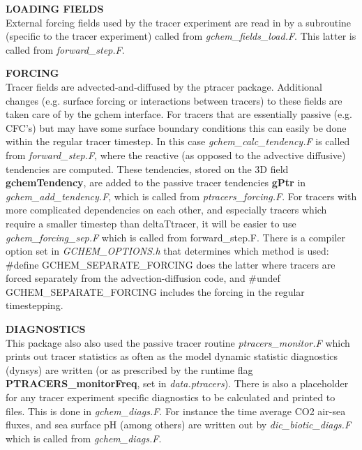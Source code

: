 \noindent
{{\bf LOADING FIELDS}}\\
External forcing fields used by the tracer experiment are read
in by a subroutine (specific to the tracer experiment) called from
{\it gchem\_fields\_load.F}. This latter is called from \textit{forward\_step.F}.

\vspace{.5cm}


\noindent
{{\bf FORCING}}\\
Tracer fields are advected-and-diffused by the ptracer package.
Additional changes (e.g. surface forcing or interactions
between tracers) to these fields are taken care of by the gchem
interface. For tracers that are essentially passive (e.g. CFC's)
but may have some surface boundary conditions
this can easily be done within the regular tracer timestep. In this case
{\it gchem\_calc\_tendency.F} is called from {\it forward\_step.F}, where the 
reactive (as opposed to the advective diffusive) tendencies are computed.
These tendencies, stored on the 3D field \textbf{gchemTendency}, are added to
the passive tracer tendencies \textbf{gPtr} in {\it gchem\_add\_tendency.F}, 
which is called from {\it ptracers\_forcing.F}.
For tracers with more complicated dependencies on each other,
and especially tracers which require a smaller timestep than
deltaTtracer, it will be easier to use {\it gchem\_forcing\_sep.F}
which is called from forward\_step.F. There is a 
compiler option set in {\it GCHEM\_OPTIONS.h} that determines
which method is used: \#define GCHEM\_SEPARATE\_FORCING
does the latter where tracers are forced separately from the
advection-diffusion code, and \#undef GCHEM\_SEPARATE\_FORCING
includes the forcing in the regular timestepping.

\vspace{.5cm}

\noindent
{{\bf DIAGNOSTICS}}\\
This package also also used the passive tracer routine {\it ptracers\_monitor.F}
which prints out tracer statistics 
as often as the model dynamic statistic diagnostics (dynsys) are written (or
as prescribed by the runtime flag \textbf{PTRACERS\_monitorFreq}, set in {\it data.ptracers}).
There is also a placeholder for any tracer experiment
specific diagnostics to be calculated and printed to files.
This is done in {\it gchem\_diags.F}. For instance the time average CO2
air-sea fluxes, and sea surface pH (among others) are written
out by {\it dic\_biotic\_diags.F} which is called from {\it gchem\_diags.F}.

